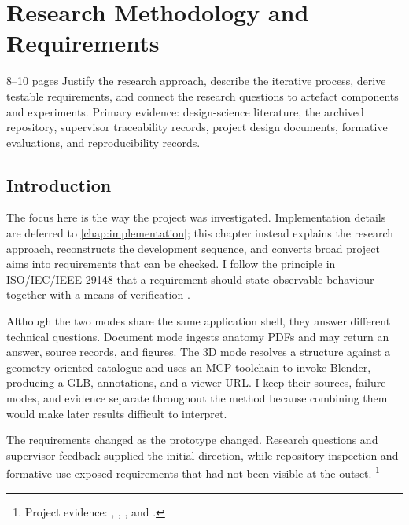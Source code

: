 %
%

\chapter{Research Methodology and Requirements}
\label{chap:methodology}

\begin{chapterplan}
  {8--10 pages}
  {Justify the research approach, describe the iterative process, derive testable requirements, and connect the research questions to artefact components and experiments.}
Primary evidence: design-science literature, the archived repository, supervisor traceability records, project design documents, formative evaluations, and reproducibility records.
\end{chapterplan}

\section{Introduction}
\label{sec:methodology-introduction}

The focus here is the way the project was investigated. Implementation details are deferred to \cref{chap:implementation}; this chapter instead explains the research approach, reconstructs the development sequence, and converts broad project aims into requirements that can be checked. I follow the principle in ISO/IEC/IEEE 29148 that a requirement should state observable behaviour together with a means of verification \parencite{iso29148}.

Although the two modes share the same application shell, they answer different technical questions. Document mode ingests anatomy PDFs and may return an answer, source records, and figures. The 3D mode resolves a structure against a geometry-oriented catalogue and uses an MCP toolchain to invoke Blender, producing a GLB, annotations, and a viewer URL. I keep their sources, failure modes, and evidence separate throughout the method because combining them would make later results difficult to interpret.

The requirements changed as the prototype changed. Research questions and supervisor feedback supplied the initial direction, while repository inspection and formative use exposed requirements that had not been visible at the outset.
\footnote{Project evidence: , , , and .}

